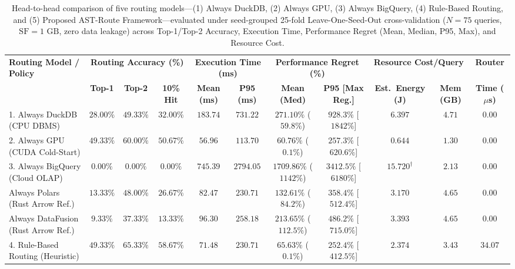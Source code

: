 \documentclass[10pt,a4paper]{article}
\newenvironment{fitasttable}{%
  \begin{lrbox}{\asttblbox}%
}{%
  \end{lrbox}%
  \sbox{\asttblboxB}{%
    \ifdim\wd\asttblbox>0.96\textwidth
      \resizebox{0.96\textwidth}{!}{\usebox{\asttblbox}}%
    \else
      \usebox{\asttblbox}%
    \fi
  }%
  \ifdim\ht\asttblboxB>0.72\textheight
    \resizebox{!}{0.72\textheight}{\usebox{\asttblboxB}}%
  \else
    \usebox{\asttblboxB}%
  \fi
}
\begin{document}
\begin{table}[!htbp]
\centering
\caption{Head-to-head comparison of five routing models---(1) Always DuckDB, (2) Always GPU, (3) Always BigQuery, (4) Rule-Based Routing, and (5) Proposed AST-Route Framework---evaluated under seed-grouped 25-fold Leave-One-Seed-Out cross-validation ($N=75$ queries, $\text{SF}=1\text{ GB}$, zero data leakage) across Top-1/Top-2 Accuracy, Execution Time, Performance Regret (Mean, Median, P95, Max), and Resource Cost.}\label{tab:jbd_routing_t8}
\label{tab:routing_evaluation}\label{tab:query_routing}\label{tab:router_eval}
\scriptsize
\setlength{\tabcolsep}{3.2pt}
\renewcommand{\arraystretch}{1.12}
\begin{fitasttable}
\begin{tabular}{@{}lcccccccccc@{}}
\toprule
\multirow{2}{*}{\textbf{Routing Model / Policy}} & \multicolumn{3}{c}{\textbf{Routing Accuracy (\%)}} & \multicolumn{2}{c}{\textbf{Execution Time (ms)}} & \multicolumn{2}{c}{\textbf{Performance Regret (\%)}} & \multicolumn{2}{c}{\textbf{Resource Cost/Query}} & \textbf{Router} \\
\cmidrule(lr){2-4} \cmidrule(lr){5-6} \cmidrule(lr){7-8} \cmidrule(lr){9-10} \cmidrule(lr){11-11}
 & \textbf{Top-1} & \textbf{Top-2} & \textbf{10\% Hit} & \textbf{Mean (ms)} & \textbf{P95 (ms)} & \textbf{Mean (Med)} & \textbf{P95 [Max Reg.]} & \textbf{Est.\ Energy (J)} & \textbf{Mem (GB)} & \textbf{Time ($\mu$s)} \\
\midrule
1. Always DuckDB (CPU DBMS) & $28.00\%$ & $49.33\%$ & $32.00\%$ & $183.74$ & $731.22$ & $271.10\%$ ($59.8\%$) & $928.3\%$ [$1842\%$] & $6.397$ & $4.71$ & $0.00$ \\
2. Always GPU (CUDA Cold-Start) & $49.33\%$ & $60.00\%$ & $50.67\%$ & $56.96$ & $113.70$ & $60.76\%$ ($0.1\%$) & $257.3\%$ [$620.6\%$] & $0.644$ & $1.30$ & $0.00$ \\
3. Always BigQuery (Cloud OLAP) & $0.00\%$ & $0.00\%$ & $0.00\%$ & $745.39$ & $2794.05$ & $1709.86\%$ ($1142\%$) & $3412.5\%$ [$6180\%$] & $15.720^{\dagger}$ & $2.13$ & $0.00$ \\
Always Polars (Rust Arrow Ref.) & $13.33\%$ & $48.00\%$ & $26.67\%$ & $82.47$ & $230.71$ & $132.61\%$ ($84.2\%$) & $358.4\%$ [$512.4\%$] & $3.170$ & $4.65$ & $0.00$ \\
Always DataFusion (Rust Arrow Ref.) & $9.33\%$ & $37.33\%$ & $13.33\%$ & $96.30$ & $258.18$ & $213.65\%$ ($112.5\%$) & $486.2\%$ [$715.0\%$] & $3.393$ & $4.65$ & $0.00$ \\
4. Rule-Based Routing (Heuristic) & $49.33\%$ & $65.33\%$ & $58.67\%$ & $71.48$ & $230.71$ & $65.63\%$ ($0.1\%$) & $252.4\%$ [$412.5\%$] & $2.374$ & $3.43$ & $34.07$ \\

\end{tabular}
\end{fitasttable}
\end{table}
\end{document}
